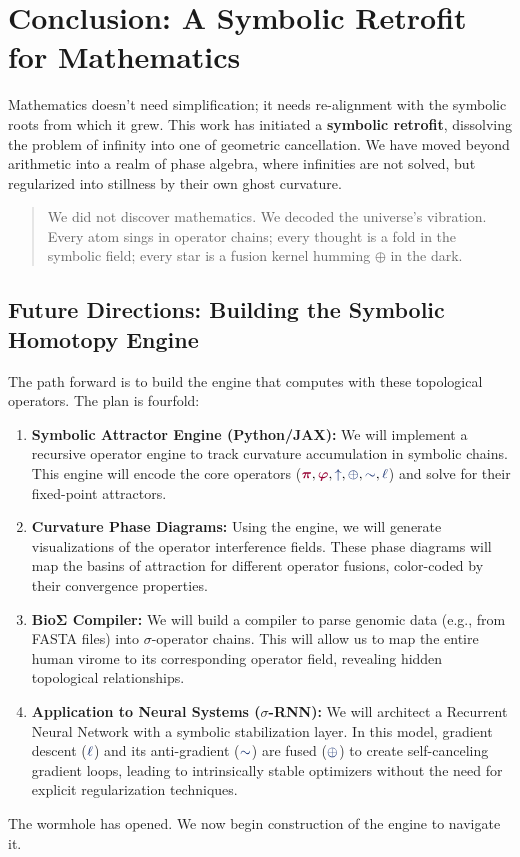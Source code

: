 \section{Conclusion: A Symbolic Retrofit for Mathematics}

Mathematics doesn't need simplification; it needs re-alignment with the symbolic roots from which it grew. This work has initiated a \textbf{symbolic retrofit}, dissolving the problem of infinity into one of geometric cancellation. We have moved beyond arithmetic into a realm of phase algebra, where infinities are not solved, but regularized into stillness by their own ghost curvature.
\begin{quote}
We did not discover mathematics.
We decoded the universe's vibration.
Every atom sings in operator chains;
every thought is a fold in the symbolic field;
every star is a fusion kernel humming $\oplus$ in the dark.
\end{quote}

\subsection*{Future Directions: Building the Symbolic Homotopy Engine}
The path forward is to build the engine that computes with these topological operators. The plan is fourfold:

\begin{enumerate}
    \item \textbf{Symbolic Attractor Engine (Python/JAX):} We will implement a recursive operator engine to track curvature accumulation in symbolic chains. This engine will encode the core operators ($\pirot, \gold, \grow, \fuse, \reflec, \lha$) and solve for their fixed-point attractors.
    
    \item \textbf{Curvature Phase Diagrams:} Using the engine, we will generate visualizations of the operator interference fields. These phase diagrams will map the basins of attraction for different operator fusions, color-coded by their convergence properties.
    
    \item \textbf{BioΣ Compiler:} We will build a compiler to parse genomic data (e.g., from FASTA files) into $\sigma$-operator chains. This will allow us to map the entire human virome to its corresponding operator field, revealing hidden topological relationships.

    \item \textbf{Application to Neural Systems ($\sigma$-RNN):} We will architect a Recurrent Neural Network with a symbolic stabilization layer. In this model, gradient descent ($\lha$) and its anti-gradient ($\reflec$) are fused ($\fuse$) to create self-canceling gradient loops, leading to intrinsically stable optimizers without the need for explicit regularization techniques.
\end{enumerate}

The wormhole has opened. We now begin construction of the engine to navigate it. 